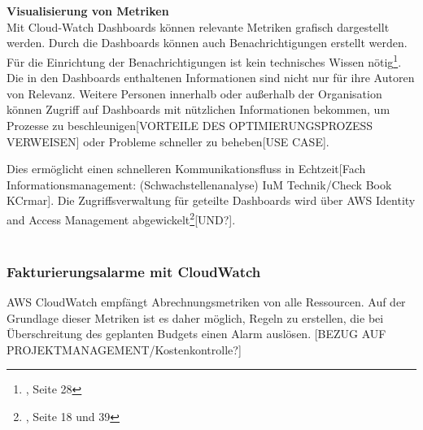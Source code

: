 \\\\
\textbf{Visualisierung von Metriken}\\
Mit Cloud-Watch Dashboards können relevante Metriken grafisch dargestellt werden. %
Durch die Dashboards können auch Benachrichtigungen erstellt werden. Für die Einrichtung der Benachrichtigungen ist kein technisches Wissen nötig\footnote{\cite{AMZ14}, Seite 28}.
Die in den Dashboards enthaltenen Informationen sind nicht nur für ihre Autoren von Relevanz.
Weitere Personen innerhalb oder außerhalb der Organisation können Zugriff auf Dashboards mit nützlichen Informationen bekommen, um Prozesse zu beschleunigen[VORTEILE DES OPTIMIERUNGSPROZESS VERWEISEN] oder Probleme schneller zu beheben[USE CASE].

Dies ermöglicht einen schnelleren Kommunikationsfluss in Echtzeit[Fach Informationsmanagement: (Schwachstellenanalyse) IuM Technik/Check Book KCrmar]. Die Zugriffsverwaltung für geteilte Dashboards wird über AWS Identity and Access Management abgewickelt\footnote{\cite{AMZ14}, Seite 18 und 39}[UND?].
\\\\
\subsubsection{Fakturierungsalarme mit CloudWatch}
AWS CloudWatch empfängt Abrechnungsmetriken von alle Ressourcen. Auf der Grundlage dieser Metriken ist es daher möglich, Regeln zu erstellen, die bei Überschreitung des geplanten Budgets einen Alarm auslösen.
[BEZUG AUF PROJEKTMANAGEMENT/Kostenkontrolle?]

